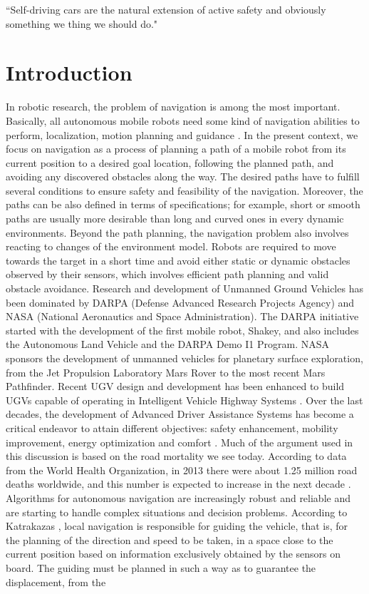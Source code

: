 \begin{savequote}[75mm]
	``Self-driving cars are the natural extension of active safety and obviously something we thing we should do."
\end{savequote}

\chapter{Introduction}
In robotic research, the problem of navigation is among the most important. Basically, all autonomous mobile robots need some kind of navigation abilities to perform, localization, motion planning and guidance \cite{Skoda:Thesis:2016}. In the present context, we focus on navigation as a process of planning a path of a mobile robot from its current position to a desired goal location, following the planned path, and avoiding any discovered obstacles along the way. The desired paths have to fulfill several conditions to ensure safety and feasibility of the navigation. Moreover, the paths can be also defined in terms of specifications; for example, short or smooth paths are usually more desirable than long and curved ones in every dynamic environments. Beyond the path planning, the navigation problem also involves reacting to changes of the environment model. Robots are required to move towards the target in a short time and avoid either static or dynamic obstacles observed by their sensors, which involves efficient path planning and valid obstacle avoidance. Research and development of Unmanned Ground Vehicles has been dominated by DARPA (Defense Advanced Research Projects Agency) and NASA (National Aeronautics and Space Administration). The DARPA initiative started with the development of the first mobile robot, Shakey, and also includes the Autonomous Land Vehicle and the DARPA Demo I1 Program. NASA sponsors the development of unmanned vehicles for planetary surface exploration, from the Jet Propulsion Laboratory Mars Rover to the most recent Mars Pathfinder. Recent UGV design and development has been enhanced to build UGVs capable of operating in Intelligent Vehicle Highway Systems \cite{Bai2015}. Over the last decades, the development of Advanced Driver Assistance Systems has become a critical endeavor to attain different objectives: safety enhancement, mobility improvement, energy optimization and comfort \cite{Gruyer2017}. Much of the argument used in this discussion is based on the road mortality we see today. According to data from the World Health Organization, in 2013 there were about 1.25 million road deaths worldwide, and this number is expected to increase in the next decade \cite{world2015global}. Algorithms for autonomous navigation are increasingly robust and reliable and are starting to handle complex situations and decision problems. According to Katrakazas \cite{Katrakazas2015}, local navigation is responsible for guiding the vehicle, that is, for the planning of the direction and speed to be taken, in a space close to the current position based on information exclusively obtained by the sensors on board. The guiding must be planned in such a way as to guarantee the displacement, from the 